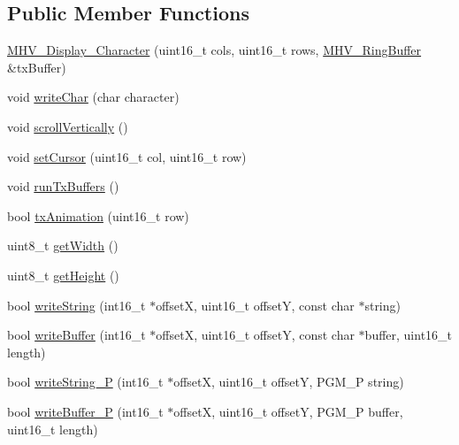\subsection*{\-Public \-Member \-Functions}
\begin{DoxyCompactItemize}
\item 
\hyperlink{class_m_h_v___display___character_ab1339d43b1804560e8a3e118b9373506}{\-M\-H\-V\-\_\-\-Display\-\_\-\-Character} (uint16\-\_\-t cols, uint16\-\_\-t rows, \hyperlink{class_m_h_v___ring_buffer}{\-M\-H\-V\-\_\-\-Ring\-Buffer} \&tx\-Buffer)
\item 
void \hyperlink{class_m_h_v___display___character_a9911b577fc34674c794bceccea827384}{write\-Char} (char character)
\item 
void \hyperlink{class_m_h_v___display___character_a1ad8bf055b841a07306a10d68586f8c7}{scroll\-Vertically} ()
\item 
void \hyperlink{class_m_h_v___display___character_a5720ca3afd3127a6a7a3294d22e2ee66}{set\-Cursor} (uint16\-\_\-t col, uint16\-\_\-t row)
\item 
void \hyperlink{class_m_h_v___display___character_ae3cf2037be781199466b44997041ab2a}{run\-Tx\-Buffers} ()
\item 
bool \hyperlink{class_m_h_v___display___character_a6c114f961e9c25d31bbad979908e7a60}{tx\-Animation} (uint16\-\_\-t row)
\item 
uint8\-\_\-t \hyperlink{class_m_h_v___display___character_af934b1439ee39e0dbc364bd50f301517}{get\-Width} ()
\item 
uint8\-\_\-t \hyperlink{class_m_h_v___display___character_a6e21f7f850ae25ecee4b02644bcc2556}{get\-Height} ()
\item 
bool \hyperlink{class_m_h_v___display___character_a5a5ab3f6e5e5c825347cc09a95bf45de}{write\-String} (int16\-\_\-t $\ast$offset\-X, uint16\-\_\-t offset\-Y, const char $\ast$string)
\item 
bool \hyperlink{class_m_h_v___display___character_aabb66a9900c911ceeee7c9d2820543dc}{write\-Buffer} (int16\-\_\-t $\ast$offset\-X, uint16\-\_\-t offset\-Y, const char $\ast$buffer, uint16\-\_\-t length)
\item 
bool \hyperlink{class_m_h_v___display___character_ab326db62411867434bdc769340672727}{write\-String\-\_\-\-P} (int16\-\_\-t $\ast$offset\-X, uint16\-\_\-t offset\-Y, \-P\-G\-M\-\_\-\-P string)
\item 
bool \hyperlink{class_m_h_v___display___character_a50c07885a440f5092c21b0d602ca5007}{write\-Buffer\-\_\-\-P} (int16\-\_\-t $\ast$offset\-X, uint16\-\_\-t offset\-Y, \-P\-G\-M\-\_\-\-P buffer, uint16\-\_\-t length)

\end{DoxyCompactItemize}
